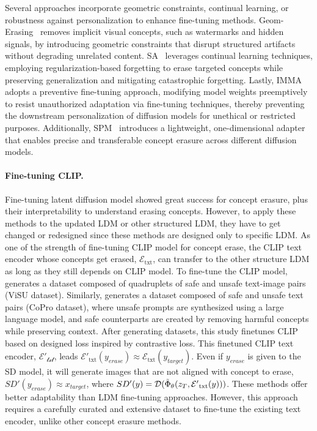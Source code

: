Several approaches incorporate geometric constraints, continual learning, or robustness against personalization to enhance fine-tuning methods. Geom-Erasing~\cite{Liu2023ImplicitCR} removes implicit visual concepts, such as watermarks and hidden signals, by introducing geometric constraints that disrupt structured artifacts without degrading unrelated content. SA~\cite{Heng2023SelectiveAA} leverages continual learning techniques, employing regularization-based forgetting to erase targeted concepts while preserving generalization and mitigating catastrophic forgetting. Lastly, IMMA~\cite{Zheng2023IMMAIT} adopts a preventive fine-tuning approach, modifying model weights preemptively to resist unauthorized adaptation via fine-tuning techniques, thereby preventing the downstream personalization of diffusion models for unethical or restricted purposes. Additionally, SPM~\cite{Lyu2023OnedimensionalAT} introduces a lightweight, one-dimensional adapter that enables precise and transferable concept erasure across different diffusion models.



\paragraph{Fine-tuning CLIP.}
Fine-tuning latent diffusion model showed great success for concept erasure, plus their interpretability to understand erasing concepts. However, to apply these methods to the updated LDM or other structured LDM, they have to get changed or redesigned since these methods are designed only to specific LDM. As one of the strength of fine-tuning CLIP model for concept erase, the CLIP text encoder whose concepts get erased, $\mathcal{E}_{\text{txt}}$, can transfer to the other structure LDM as long as they still depends on CLIP model. To fine-tune the CLIP model, \cite{safe_clip} generates a dataset composed of quadruplets of safe and unsafe text-image pairs (ViSU dataset). 
Similarly, \cite{Liu2024LatentGA} generates a dataset composed of safe and unsafe text pairs (CoPro dataset), where unsafe prompts are synthesized using a large language model, and safe counterparts are created by removing harmful concepts while preserving context.
After generating datasets, this study finetunes CLIP based on designed loss inspired by contrastive loss. This finetuned CLIP text encoder, $\mathcal{E'_{\text{txt}}}$, leads $\mathcal{E'}_{\text{txt}}(y_{erase}) \approx \mathcal{E}_{\text{txt}}(y_{target})$. Even if $y_{erase}$ is given to the SD model, it will generate images that are not aligned with concept to erase, $SD'(y_{erase}) \approx x_{target}$, where $SD'(y) = \mathcal{D}(\Tilde{\Phi}_{\theta}(z_T, \mathcal{E'}_{\text{txt}}(y)))$.
These methods offer better adaptability than LDM fine-tuning approaches. However, this approach requires a carefully curated and extensive dataset to fine-tune the existing text encoder, unlike other concept erasure methods.


